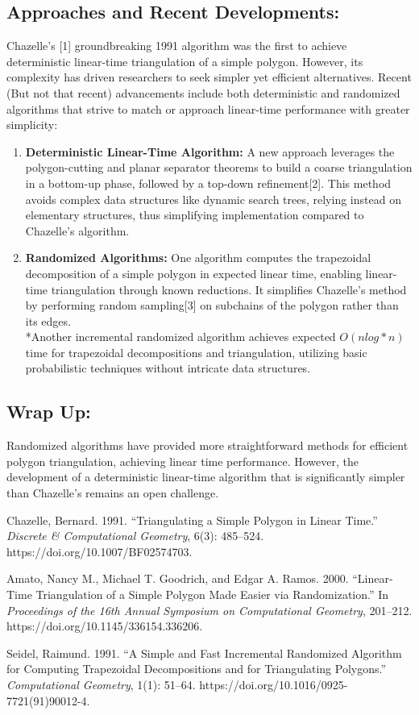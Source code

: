 \documentclass{article}
\begin{document}
\subsection*{Approaches and Recent Developments:}
Chazelle's [1] groundbreaking 1991 algorithm was the first to achieve deterministic linear-time triangulation of a simple polygon. However, its complexity has driven researchers to seek simpler yet efficient alternatives. Recent (But not that recent) advancements include both deterministic and randomized algorithms that strive to match or approach linear-time performance with greater simplicity:
\begin{enumerate}
    \item \textbf{Deterministic Linear-Time Algorithm: }
    A new approach leverages the polygon-cutting and planar separator theorems to build a coarse triangulation in a bottom-up phase, followed by a top-down refinement[2]. This method avoids complex data structures like dynamic search trees, relying instead on elementary structures, thus simplifying implementation compared to Chazelle's algorithm.
    \item \textbf{Randomized Algorithms: }
    One algorithm computes the trapezoidal decomposition of a simple polygon in expected linear time, enabling linear-time triangulation through known reductions. It simplifies Chazelle's method by performing random sampling[3] on subchains of the polygon rather than its edges.
    \\
    *Another incremental randomized algorithm achieves expected $O(nlog*n)$ time for trapezoidal decompositions and triangulation, utilizing basic probabilistic techniques without intricate data structures.
\end{enumerate}

\subsection*{Wrap Up:}
Randomized algorithms have provided more straightforward methods for efficient polygon triangulation, achieving linear time performance. However, the development of a deterministic linear-time algorithm that is significantly simpler than Chazelle's remains an open challenge.


\begin{thebibliography}{3}
    Chazelle, Bernard. 1991. “Triangulating a Simple Polygon in Linear Time.” \textit{Discrete \& Computational Geometry}, 6(3): 485–524. https://doi.org/10.1007/BF02574703.

    Amato, Nancy M., Michael T. Goodrich, and Edgar A. Ramos. 2000. “Linear-Time Triangulation of a Simple Polygon Made Easier via Randomization.” In \textit{Proceedings of the 16th Annual Symposium on Computational Geometry}, 201–212. https://doi.org/10.1145/336154.336206.

    Seidel, Raimund. 1991. “A Simple and Fast Incremental Randomized Algorithm for Computing Trapezoidal Decompositions and for Triangulating Polygons.” \textit{Computational Geometry}, 1(1): 51–64. https://doi.org/10.1016/0925-7721(91)90012-4.
\end{thebibliography}
\end{document}
